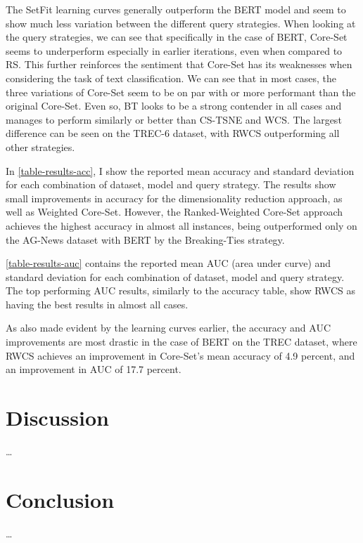 \documentclass[english,bachelor,ul]{webisthesis} %
\begin{document}
The SetFit learning curves generally outperform the BERT model and seem to show much less variation between the different query strategies. When looking at the query strategies, we can see that specifically in the case of BERT, Core-Set seems to underperform especially in earlier iterations, even when compared to RS. This further reinforces the sentiment that Core-Set has its weaknesses when considering the task of text classification. We can see that in most cases, the three variations of Core-Set seem to be on par with or more performant than the original Core-Set. Even so, BT looks to be a strong contender in all cases and manages to perform similarly or better than CS-TSNE and WCS. The largest difference can be seen on the TREC-6 dataset, with RWCS outperforming all other strategies.

In \ref{table-results-acc}, I show the reported mean accuracy and standard deviation for each combination of dataset, model and query strategy. The results show small improvements in accuracy for the dimensionality reduction approach, as well as Weighted Core-Set. However, the Ranked-Weighted Core-Set approach achieves the highest accuracy in almost all instances, being outperformed only on the AG-News dataset with BERT by the Breaking-Ties strategy.

\ref{table-results-auc} contains the reported mean AUC (area under curve) and standard deviation for each combination of dataset, model and query strategy. The top performing AUC results, similarly to the accuracy table, show RWCS as having the best results in almost all cases. 

As also made evident by the learning curves earlier, the accuracy and AUC improvements are most drastic in the case of BERT on the TREC dataset, where RWCS achieves an improvement in Core-Set's mean accuracy of 4.9 percent, and an improvement in AUC of 17.7 percent.

\chapter{Discussion}

\dots

\chapter{Conclusion}

\dots

\end{document}
